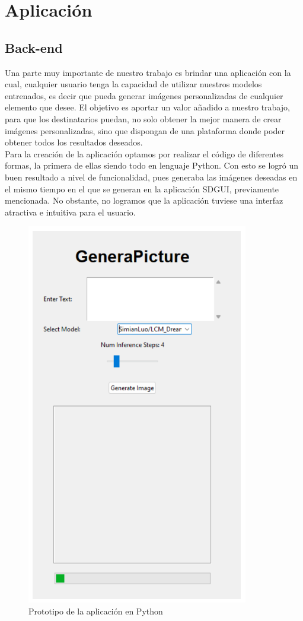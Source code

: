 \chapter{Aplicación}
\label{cap:descripcionTrabajo}

\section{Back-end}
Una parte muy importante de nuestro trabajo es brindar una aplicación con la cual, cualquier usuario tenga la capacidad de utilizar nuestros modelos entrenados, es decir que pueda generar imágenes personalizadas de cualquier elemento que desee. El objetivo es aportar un valor añadido a nuestro trabajo, para que los destinatarios puedan, no solo obtener la mejor manera de crear imágenes personalizadas, sino que dispongan de una plataforma donde poder obtener todos los resultados deseados.\\

Para la creación de la aplicación optamos por realizar el código de diferentes formas, la primera de ellas siendo todo en lenguaje Python. Con esto se logró un buen resultado a nivel de funcionalidad, pues generaba las imágenes deseadas en el mismo tiempo en el que se generan en la aplicación SDGUI, previamente mencionada. No obstante, no logramos que la aplicación tuviese una interfaz atractiva e intuitiva para el usuario.\\

\begin{figure}[!htb]
	\centering
	\includegraphics[width = 0.7
	\textwidth]{Imagenes/Vectorial/app1.png}
	\caption{Prototipo de la aplicación en Python}
	\label{fig:app1}
\end{figure}

